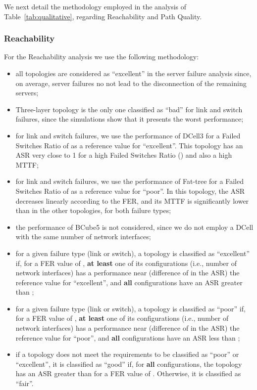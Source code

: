We next detail the methodology employed in the analysis of Table~\ref{tab:qualitative}, regarding Reachability and Path Quality.

\subsubsection{Reachability}

For the Reachability analysis we use the following methodology:

\begin{itemize}
\item all topologies are considered as ``excellent'' in the server failure analysis since, on average, server failures no not lead to the disconnection of the remaining servers;
\item Three-layer topology is the only one classified as ``bad'' for link and switch failures, since the simulations show that it presents the worst performance;
\item for link and switch failures, we use the performance of DCell3 for a Failed Switches Ratio of  as a reference value for ``excellent''. This topology has an ASR very close to 1 for a high Failed Switches Ratio () and also a high MTTF;
\item for link and switch failures, we use the performance of Fat-tree for a Failed Switches Ratio of  as a reference value for ``poor''. In this topology, the ASR decreases linearly according to the FER, and its MTTF is significantly lower than in the other topologies, for both failure types;
\item the performance of BCube5 is not considered, since we do not employ a DCell with the same number of network interfaces;
\item for a given failure type (link or switch), a topology is classified as ``excellent'' if, for a FER value of , \textbf{at least} one of its configurations (i.e., number of network interfaces) has a performance near (difference of  in the ASR) the reference value for ``excellent'', and \textbf{all} configurations have an ASR greater than ; 
\item for a given failure type (link or switch), a topology is classified as ``poor'' if, for a FER value of , \textbf{at least} one of its configurations (i.e., number of network interfaces) has a performance near (difference of  in the ASR) the reference value for ``poor'',  and \textbf{all} configurations have an ASR less than ;
\item if a topology does not meet the requirements to be classified as ``poor'' or ``excellent'', it is classified as  ``good'' if, for \textbf{all} configurations, the topology has an ASR greater than  for a FER value of . Otherwise, it is classified as ``fair''.
\end{itemize}


